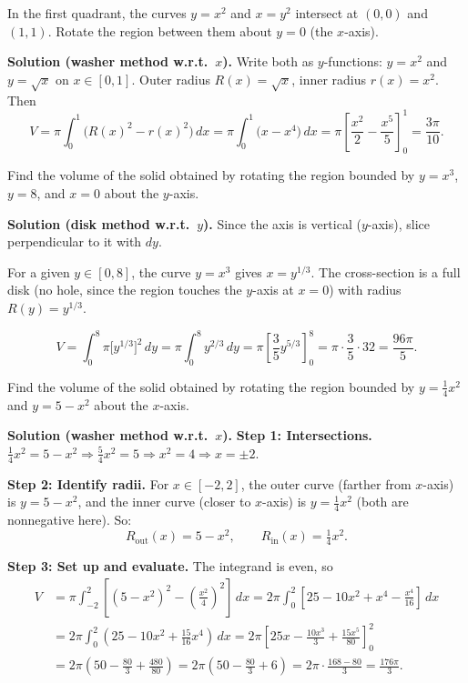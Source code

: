 \begin{examplebox}[title={Worked Example (Lecture Example 2.6): Rotate region between $y=x^2$ and $x=y^2$ about $y=0$}]
In the first quadrant, the curves $y=x^2$ and $x=y^2$ intersect at $(0,0)$ and $(1,1)$.
Rotate the region between them about $y=0$ (the $x$-axis).

\textbf{Solution (washer method w.r.t.\ $x$).}
Write both as $y$-functions: $y=x^2$ and $y=\sqrt{x}$ on $x\in[0,1]$.
Outer radius $R(x)=\sqrt{x}$, inner radius $r(x)=x^2$. Then
\[
V=\pi\int_{0}^{1}\bigl(R(x)^2-r(x)^2\bigr)\,dx
=\pi\int_{0}^{1}\bigl(x-x^4\bigr)\,dx
=\pi\left[\frac{x^2}{2}-\frac{x^5}{5}\right]_{0}^{1}
=\frac{3\pi}{10}.
\]
\end{examplebox}

\begin{examplebox}[title={Worked Example (Lecture Example 2.4): Disk method about the $y$-axis}]
Find the volume of the solid obtained by rotating the region bounded by $y=x^3$, $y=8$, and $x=0$ about the $y$-axis.

\textbf{Solution (disk method w.r.t.\ $y$).}
Since the axis is vertical ($y$-axis), slice perpendicular to it with $dy$.

For a given $y\in[0,8]$, the curve $y=x^3$ gives $x=y^{1/3}$. The cross-section is a full disk (no hole, since the region touches the $y$-axis at $x=0$) with radius $R(y)=y^{1/3}$.

\[
V=\int_0^8 \pi\bigl[y^{1/3}\bigr]^2\,dy
=\pi\int_0^8 y^{2/3}\,dy
=\pi\left[\frac{3}{5}y^{5/3}\right]_0^8
=\pi\cdot\frac{3}{5}\cdot 32
=\frac{96\pi}{5}.
\]
\end{examplebox}

\begin{examplebox}[title={Worked Example (Tutorial 4, Q4(b)): Washer method with shifted axis}]
Find the volume of the solid obtained by rotating the region bounded by $y=\frac{1}{4}x^2$ and $y=5-x^2$ about the $x$-axis.

\textbf{Solution (washer method w.r.t.\ $x$).}
\textbf{Step 1: Intersections.} $\frac{1}{4}x^2=5-x^2 \Rightarrow \frac{5}{4}x^2=5 \Rightarrow x^2=4 \Rightarrow x=\pm 2$.

\textbf{Step 2: Identify radii.} For $x\in[-2,2]$, the outer curve (farther from $x$-axis) is $y=5-x^2$, and the inner curve (closer to $x$-axis) is $y=\frac{1}{4}x^2$ (both are nonneg\-ative here). So:
\[
R_{\text{out}}(x)=5-x^2,\qquad R_{\text{in}}(x)=\tfrac{1}{4}x^2.
\]

\textbf{Step 3: Set up and evaluate.} The integrand is even, so
\begin{align*}
V&=\pi\int_{-2}^{2}\left[(5-x^2)^2-\left(\tfrac{x^2}{4}\right)^2\right]\,dx
=2\pi\int_{0}^{2}\left[25-10x^2+x^4-\frac{x^4}{16}\right]\,dx\\
&=2\pi\int_0^2\left(25-10x^2+\frac{15}{16}x^4\right)\,dx
=2\pi\left[25x-\frac{10x^3}{3}+\frac{15x^5}{80}\right]_0^2\\
&=2\pi\left(50-\frac{80}{3}+\frac{480}{80}\right)
=2\pi\left(50-\frac{80}{3}+6\right)
=2\pi\cdot\frac{168-80}{3}
=\frac{176\pi}{3}.
\end{align*}
\end{examplebox}


